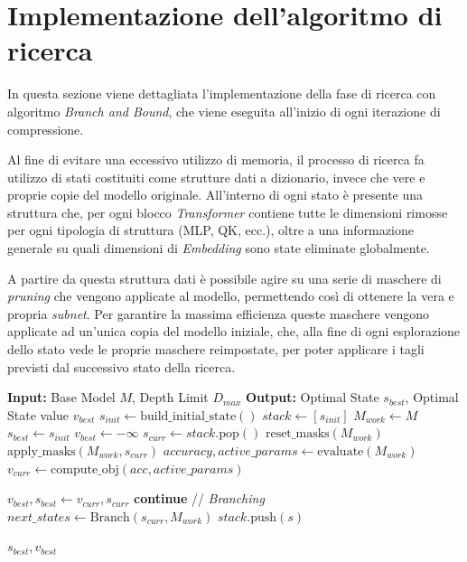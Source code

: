 \section{Implementazione dell'algoritmo di ricerca}
\label{section:metodo_ricerca}
In questa sezione viene dettagliata l'implementazione della fase di ricerca con algoritmo \textit{Branch and Bound}, che viene eseguita all'inizio di ogni iterazione di compressione. \par
Al fine di evitare una eccessivo utilizzo di memoria, il processo di ricerca fa utilizzo di stati costituiti come strutture dati a dizionario, invece che vere e proprie copie del modello originale. All'interno di ogni stato è presente una struttura che, per ogni blocco \textit{Transformer} contiene tutte le dimensioni rimosse per ogni tipologia di struttura (MLP, QK, ecc.), oltre a una informazione generale su quali dimensioni di \textit{Embedding} sono state eliminate globalmente. \par
A partire da questa struttura dati è possibile agire su una serie di maschere di \textit{pruning} che vengono applicate al modello, permettendo così di ottenere la vera e propria \textit{subnet}. Per garantire la massima efficienza queste maschere vengono applicate ad un'unica copia del modello iniziale, che, alla fine di ogni esplorazione dello stato vede le proprie maschere reimpostate, per poter applicare i tagli previsti dal successivo stato della ricerca.
\begin{algorithm}[H]
\caption{Ricerca via Depth-First Branch and Bound a profondità limitata}
\label{alg:nas_search}
\begin{algorithmic}[1]
    \State \textbf{Input:} Base Model $M$, Depth Limit $D_{max}$
    \State \textbf{Output:} Optimal State $s_{best}$, Optimal State value $v_{best}$
    \State $s_{init} \gets \text{build\_initial\_state}()$
    \State $stack \gets [s_{init}]$ 
    \State $M_{work} \gets M$
    \State $s_{best} \gets s_{init}$
    \State $v_{best} \gets -\infty$
        \State $s_{curr} \gets stack.\text{pop}()$
        \State $\text{reset\_masks}(M_{work})$
        \State $\text{apply\_masks}(M_{work}, s_{curr})$
        \State $accuracy, active\_params \gets \text{evaluate}(M_{work})$ 
        \State $v_{curr} \gets \text{compute\_obj}(acc, active\_params)$

            \State $v_{best}, s_{best} \gets v_{curr}, s_{curr}$
        \EndIf
            \State \textbf{continue} 
        \EndIf
        \State // \textit{Branching}
        \State $next\_states \gets \text{Branch}(s_{curr}, M_{work})$
            \State $stack.\text{push}(s)$
        \EndFor
    \EndWhile
    
    \State \Return $s_{best}, v_{best}$
\end{algorithmic}
\end{algorithm}





